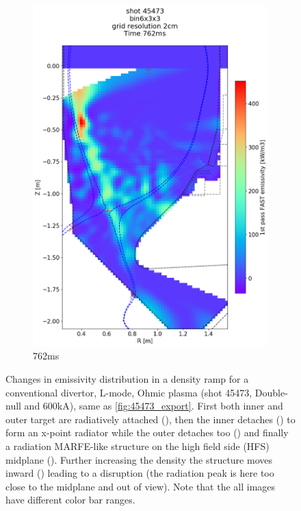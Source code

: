 \begin{figure}
\begin{subfigure}{0.4\linewidth}
         \includegraphics[trim={5 25 0 190},clip,width=\textwidth]{Chapters/chapter2/figs/IRVB-MASTU_shot-45473_export_71.png}
         \vspace*{-6.5mm}
         \caption{762ms}
         \label{fig:45473_export2_5}
     \end{subfigure}
    \vspace*{-3mm}
    \caption{Changes in emissivity distribution in a density ramp for a conventional divertor, L-mode, Ohmic plasma (shot 45473, Double-null and 600kA), same as \autoref{fig:45473_export}. First both inner and outer target are radiatively attached (), then the inner detaches () to form an x-point radiator while the outer detaches too () and finally a radiation MARFE-like structure on the high field side (HFS) midplane (). Further increasing the density the structure moves inward () leading to a disruption (the radiation peak is here too close to the midplane and out of view). Note that the all images have different color bar ranges.}
    \label{fig:45473_export2}
\end{figure}

